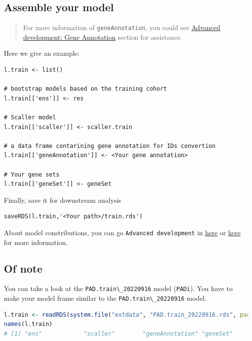 \documentclass[
  12pt,
]{book}
\newcommand{\passthrough}[1]{#1}
\begin{document}
\hypertarget{assemble-your-model}{%
\subsection{Assemble your model}\label{assemble-your-model}}

\begin{quote}
For more information of \passthrough{\lstinline!geneAnnotation!}, you could see \href{https://github.com/huangwb8/GSClassifier/wiki/Advanced-development\#Gene-Annotation}{Advanced development: Gene Annotation} section for assistance.
\end{quote}

Here we give an example:

\begin{lstlisting}
l.train <- list()

# bootstrap models based on the training cohort
l.train[['ens']] <- res 

# Scaller model
l.train[['scaller']] <- scaller.train 

# a data frame contarining gene annotation for IDs convertion
l.train[['geneAnnotation']] <- <Your gene annotation>

# Your gene sets
l.train[['geneSet']] <- geneSet
\end{lstlisting}

Finally, save it for downstream analysis

\begin{lstlisting}
saveRDS(l.train,'<Your path>/train.rds')
\end{lstlisting}

About model constributions, you can go \passthrough{\lstinline!Advanced development!} in \href{https://github.com/huangwb8/GSClassifier/wiki/Advanced-development}{here} or \href{http://htmlpreview.github.io/?https://raw.githubusercontent.com/wiki/huangwb8/GSClassifier/Advanced-development.html}{here} for more information.

\hypertarget{of-note-2}{%
\subsection{Of note}\label{of-note-2}}

You can take a look at the \passthrough{\lstinline!PAD.train\_20220916!} model (\passthrough{\lstinline!PADi!}). You have to make your model frame similar to the \passthrough{\lstinline!PAD.train\_20220916!} model.

\begin{lstlisting}[language=R]
l.train <- readRDS(system.file("extdata", "PAD.train_20220916.rds", package = "GSClassifier"))
names(l.train)
# [1] "ens"            "scaller"        "geneAnnotation" "geneSet"
\end{lstlisting}
\end{document}
